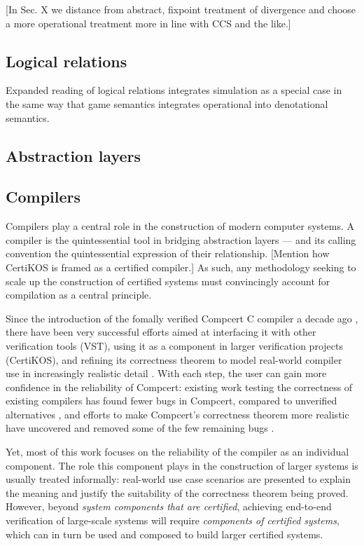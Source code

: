 [In Sec. X we distance from abstract, fixpoint treatment
of divergence and choose a more operational treatment
more in line with CCS and the like.]


\subsection{Logical relations} %

Expanded reading of logical relations
integrates simulation as a special case
in the same way that game semantics
integrates operational into denotational semantics.


\subsection{Abstraction layers} %


\subsection{Compilers} %

Compilers play a central role
in the construction of modern computer systems.
A compiler is the quintessential tool
in bridging abstraction layers ---
and its calling convention
the quintessential expression of their relationship.
[Mention how CertiKOS is framed as a certified compiler.]
As such,
any methodology seeking to scale up
the construction of certified systems
must convincingly account for compilation
as a central principle.

Since the introduction of the fomally verified
Compcert C compiler a decade ago \cite{compcert},
there have been very successful efforts aimed at
interfacing it with other verification tools (VST),
using it as a component in larger verification projects (CertiKOS),
and refining its correctness theorem
to model real-world compiler use
in increasingly realistic detail
\citep{qompcert,sepcompcert,compcompcert,compcerttso,compcertshm}.
With each step,
the user can gain more confidence in the reliability of Compcert:
existing work testing the correctness of existing compilers
has found fewer bugs in Compcert,
compared to unverified alternatives \citep{csmith},
and efforts to make Compcert's correctness theorem more realistic
have uncovered and removed some of the few remaining bugs \citep{sepcompcert}.

Yet, most of this work
focuses on the reliability of the compiler
as an individual component.
The role this component plays in the construction of larger systems
is usually treated informally:
real-world use case scenarios are presented
to explain the meaning and justify the suitability
of the correctness theorem being proved.
However,
beyond \emph{system components that are certified},
achieving end-to-end verification of large-scale systems
will require \emph{components of certified systems},
which can in turn be used and composed
to build larger certified systems.

